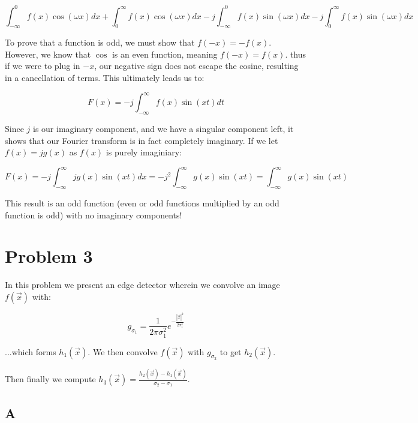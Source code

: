\documentclass{article}
\begin{document}
\begin{equation}
    \int_{-\infty}^{0} f(x)\cos(\omega x) dx + \int_{0}^{\infty} f(x)\cos(\omega x) dx - j \int_{-\infty}^{0} f(x) \sin(\omega x) dx - j \int_{0}^{\infty} f(x) \sin(\omega x) dx
\end{equation}

\noindent To prove that a function is odd, we must show that $f(-x) = -f(x)$. However, we know that $\cos$ is an even function, meaning $f(-x)=f(x)$. thus if we were to plug in $-x$, our negative sign does not escape the cosine, resulting in a cancellation of terms. This ultimately leads us to:

\begin{equation}
    F(x) = -j \int_{-\infty}^{\infty} f(x) \sin(xt) dt
\end{equation}

\noindent Since $j$ is our imaginary component, and we have a singular component left, it shows that our Fourier transform is in fact completely imaginary. If we let $f(x) = jg(x)$ as $f(x)$ is purely imaginiary:

\begin{equation}
    F(x) = -j \int_{-\infty}^{\infty} jg(x) \sin(xt) dx = -j^2 \int_{-\infty}^{\infty} g(x) \sin(xt) = \int_{-\infty}^{\infty} g(x) \sin(xt)
\end{equation}

This result is an odd function (even or odd functions multiplied by an odd function is odd) with no imaginary components!


\section*{Problem 3}

In this problem we present an edge detector wherein we convolve an image $f(\vec{x})$ with:

\begin{equation}
     g_{\sigma_1} = \frac{1}{2\pi \sigma_1^2}e^{-\frac{|\vec{x}|^2}{2\sigma_1^2}}
\end{equation}

\noindent ...which forms $h_1(\vec{x})$. We then convolve $f(\vec{x})$ with $g_{\sigma_2}$ to get $h_2(\vec{x})$.

\noindent Then finally we compute $h_3(\vec{x}) = \frac{h_2(\vec{x}) - h_1(\vec{x})}{\sigma_2 - \sigma_1} $.

\subsection*{A}
\end{document}
